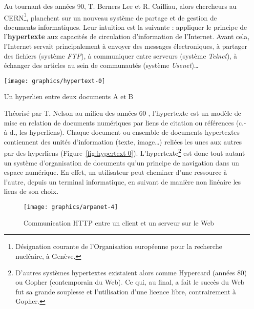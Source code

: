\documentclass[symmetric,justified,marginals=raggedouter]{tufte-book}
\begin{document}
\noindent Au tournant des années 90, T. Berners Lee et R. Cailliau, alors chercheurs au CERN\footnote{\RaggedOuter Désignation courante de l'Organisation européenne pour la recherche nucléaire, à Genève.}, planchent sur un nouveau système de partage et de gestion de documents informatiques. Leur intuition est la suivante : appliquer le principe de l'\textbf{hypertexte} aux capacités de circulation d'information de l'Internet. Avant cela, l'Internet servait principalement à envoyer des messages électroniques, à partager des fichiers (système \textit{FTP}), à communiquer entre serveurs (système \textit{Telnet}), à échanger des articles au sein de communautés (système \textit{Usenet})\ldots{}

\begin{marginfigure}%
  \texttt{[image: graphics/hypertext-0]}
  \vspace*{0.2cm}  
  \caption{Un hyperlien entre deux documents A et B}
  \label{fig:hypertext-0}
\end{marginfigure} 

Théorisé par T. Nelson au milieu des années 60 \citep{nelson_getting_1967}, l'hypertexte est un modèle de mise en relation de documents numé\-riques par liens de citation ou références (c.-à-d., les hyperliens). Chaque document ou ensemble de documents hypertextes contiennent des unités d'information (texte, image\ldots{}) reliées les unes aux autres par des hyperliens (Figure~\ref{fig:hypertext-0}). L'hypertexte\footnote{\RaggedOuter D'autres systèmes hypertextes existaient alors comme Hypercard (années 80) ou Gopher (contemporain du Web). Ce qui, au final, a fait le succès du Web fut sa grande souplesse et l'utilisation d'une licence libre, contrairement à Gopher.} est donc tout autant un système d'organisation de documents qu'un principe de navigation dans un espace numérique. En effet, un utilisateur peut cheminer d'une ressource à l'autre, depuis un terminal informatique, en suivant de manière non linéaire les liens de son choix. 

\begin{figure*}
  \texttt{[image: graphics/arpanet-4]}
  \caption{Communication HTTP entre un client et un serveur sur le Web}
  \label{fig:arpanet-4}
\end{figure*} 
\end{document}
